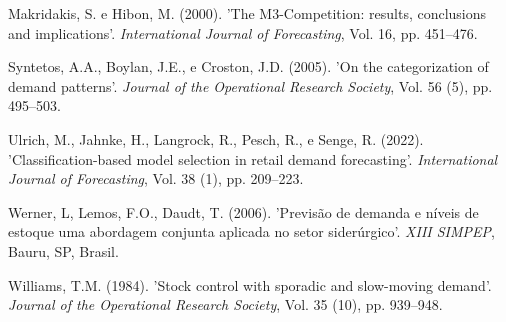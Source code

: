 \documentclass{book}
\begin{document}
\begin{thebibliography}{12}
Makridakis, S. e Hibon, M. (2000). 'The M3-Competition: results, conclusions and implications'. {\it International Journal of Forecasting}, Vol. 16, pp. 451--476.

Syntetos, A.A., Boylan, J.E., e Croston, J.D. (2005). 'On the categorization of demand patterns'. {\it Journal of the Operational Research Society}, Vol. 56 (5), pp. 495--503.

Ulrich, M., Jahnke, H., Langrock, R., Pesch, R., e Senge, R. (2022). 'Classification-based model selection in retail demand forecasting'. {\it International Journal of Forecasting}, Vol. 38 (1), pp. 209--223.

Werner, L, Lemos, F.O., Daudt, T. (2006). 'Previsão de demanda e níveis de estoque uma abordagem conjunta aplicada no setor siderúrgico'. {\it XIII SIMPEP}, Bauru, SP, Brasil.

Williams, T.M. (1984). 'Stock control with sporadic and slow-moving demand'. {\it Journal of the Operational Research Society}, Vol. 35 (10), pp. 939–948. 

\end{thebibliography}
\end{document}
